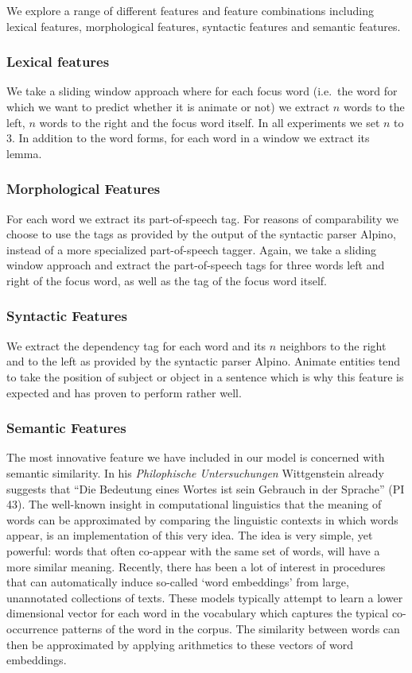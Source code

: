 \documentclass[a4paper,UKenglish]{oasics}
\begin{document}
We explore a range of different features and feature combinations
including lexical features, morphological features, syntactic features
and semantic features.

\subsubsection{Lexical features}
We take a sliding window approach where for each focus word (i.e.\ the
word for which we want to predict whether it is animate or not) we
extract $n$ words to the left, $n$ words to the right and the focus
word itself. In all experiments we set $n$ to 3. In addition to the
word forms, for each word in a window we extract its lemma.

\subsubsection{Morphological Features}
For each word we extract its part-of-speech tag. For reasons of
comparability we choose to use the tags as provided by the output of
the syntactic parser Alpino, instead of a more specialized
part-of-speech tagger. Again, we take a sliding window approach and
extract the part-of-speech tags for three words left and right of the focus word, as well as the tag of the focus word itself.

\subsubsection{Syntactic Features}
We extract the dependency tag for each word and its $n$ neighbors to
the right and to the left as provided by the syntactic parser
Alpino. Animate entities tend to take the position of subject or
object in a sentence which is why this feature is expected and has
proven to perform rather well.


\subsubsection{Semantic Features} The most innovative feature we have
included in our model is concerned with semantic similarity. In his
\textit{Philophische Untersuchungen} Wittgenstein already suggests
that ``Die Bedeutung eines Wortes ist sein Gebrauch in der Sprache''
(PI 43). The well-known insight in computational linguistics that the
meaning of words can be approximated by comparing the linguistic
contexts in which words appear, is an implementation of this very
idea. The idea is very simple, yet powerful: words that often
co-appear with the same set of words, will have a more similar
meaning. Recently, there has been a lot of interest in procedures that
can automatically induce so-called `word embeddings' from large,
unannotated collections of texts. These models typically attempt to
learn a lower dimensional vector for each word in the vocabulary which
captures the typical co-occurrence patterns of the word in the
corpus. The similarity between words can then be approximated by
applying arithmetics to these vectors of word embeddings.
\end{document}
